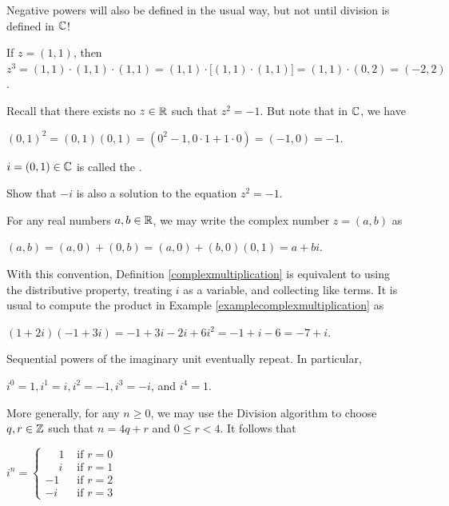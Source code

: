 \documentclass[11pt,fleqn,dvipsnames,usenames]{article}
\newcommand{\p}{\noindent}
\begin{document}
\note Negative powers will also be defined in the usual way, but not until division is defined in $\mathbb{C}$!

\begin{example}
If $z = (1,1)$, then $z^3 = (1,1)\cdot (1,1)\cdot (1,1) = (1,1)\cdot \big[(1,1)\cdot (1,1)\big] = (1,1)\cdot(0,2) = (-2, 2)$.
\end{example}
%
\observation Recall that there exists no $z\in\mathbb{R}$ such that $z^2 = -1$.  But note that in $\mathbb{C}$, we have
\begin{center}
$(0,1)^2 = (0,1)(0,1) = (0^2 - 1, 0\cdot 1 + 1\cdot 0) = (-1,0) = -1$.
\end{center}
\vsp

\terminology $i = (0,1)\in\mathbb{C}$ is called the .
\vsp

\begin{exercise}
Show that $-i$ is also a solution to the equation $z^{2} = -1$.
\end{exercise}

\notation For any real numbers $a,b\in\mathbb{R}$, we may write the complex number $z = (a,b)$ as
\begin{center}
$(a,b) = (a,0) + (0,b) = (a,0) + (b,0)(0,1) = a + bi$.
\end{center}
\vsp

\p With this convention, Definition \ref{complexmultiplication} is equivalent to using the distributive property, treating $i$ as a variable, and collecting like terms.  It is usual to compute the product in Example \ref{examplecomplexmultiplication} as
\begin{center}
$(1 + 2i)(-1 + 3i) = -1 + 3i - 2i + 6i^2 = -1 + i - 6 = -7 + i$.
\end{center}

\observation Sequential powers of the imaginary unit eventually repeat.  In particular,
\begin{center}
$i^{0} = 1, i^{1} = i, i^{2} = -1, i^{3} = -i$, and $i^{4} = 1$.
\end{center}

\p More generally, for any $n\geq 0$, we may use the Division algorithm to choose $q,r\in\mathbb{Z}$ such that $n = 4q + r$ and $0\leq r < 4$.  It follows that
\begin{center}
$i^{n} = \begin{cases}\phantom{-}1 & \text{ if } r = 0\\\phantom{-}i & \text{ if }r = 1\\-1 & \text{ if } r = 2\\-i & \text{ if }r = 3\end{cases}$
\end{center}
\vsp
\end{document}
